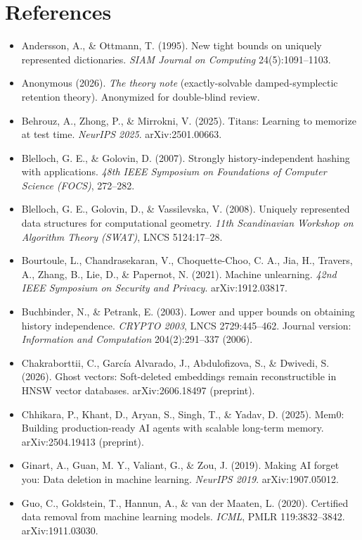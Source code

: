 \documentclass{article}
\begin{document}
\section*{References}
{\tiny\begin{itemize}\itemsep0pt \parskip0pt
\item Andersson, A., \& Ottmann, T. (1995). New tight bounds on uniquely represented dictionaries. \emph{SIAM Journal on Computing} 24(5):1091--1103.
\item Anonymous (2026). \emph{The theory note} (exactly-solvable damped-symplectic retention theory). Anonymized for double-blind review.
\item Behrouz, A., Zhong, P., \& Mirrokni, V. (2025). Titans: Learning to memorize at test time. \emph{NeurIPS 2025}. arXiv:2501.00663.
\item Blelloch, G. E., \& Golovin, D. (2007). Strongly history-independent hashing with applications. \emph{48th IEEE Symposium on Foundations of Computer Science (FOCS)}, 272--282.
\item Blelloch, G. E., Golovin, D., \& Vassilevska, V. (2008). Uniquely represented data structures for computational geometry. \emph{11th Scandinavian Workshop on Algorithm Theory (SWAT)}, LNCS 5124:17--28.
\item Bourtoule, L., Chandrasekaran, V., Choquette-Choo, C. A., Jia, H., Travers, A., Zhang, B., Lie, D., \& Papernot, N. (2021). Machine unlearning. \emph{42nd IEEE Symposium on Security and Privacy}. arXiv:1912.03817.
\item Buchbinder, N., \& Petrank, E. (2003). Lower and upper bounds on obtaining history independence. \emph{CRYPTO 2003}, LNCS 2729:445--462. Journal version: \emph{Information and Computation} 204(2):291--337 (2006).
\item Chakraborttii, C., Garc\'ia Alvarado, J., Abdulofizova, S., \& Dwivedi, S. (2026). Ghost vectors: Soft-deleted embeddings remain reconstructible in HNSW vector databases. arXiv:2606.18497 (preprint).
\item Chhikara, P., Khant, D., Aryan, S., Singh, T., \& Yadav, D. (2025). Mem0: Building production-ready AI agents with scalable long-term memory. arXiv:2504.19413 (preprint).
\item Ginart, A., Guan, M. Y., Valiant, G., \& Zou, J. (2019). Making AI forget you: Data deletion in machine learning. \emph{NeurIPS 2019}. arXiv:1907.05012.
\item Guo, C., Goldstein, T., Hannun, A., \& van der Maaten, L. (2020). Certified data removal from machine learning models. \emph{ICML}, PMLR 119:3832--3842. arXiv:1911.03030.

\end{itemize}}
\end{document}
